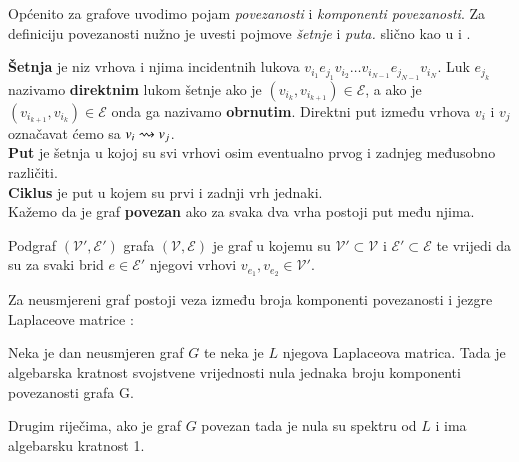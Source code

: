 Općenito za grafove uvodimo pojam \emph{povezanosti} i \emph{komponenti povezanosti}. Za definiciju povezanosti nužno je uvesti pojmove \emph{šetnje} i \emph{puta.} slično kao u \cite{Diskretna} i \cite{Operacijska}.
\begin{defn}
    \textbf{Šetnja} je niz vrhova i njima incidentnih lukova $v_{i_1} e_{j_1} v_{i_2} \dots v_{i_{N-1}} e_{j_{N-1}} v_{i_N}$. Luk $e_{j_k}$ nazivamo \textbf{direktnim} lukom šetnje ako je $(v_{i_k},v_{i_{k+1}}) \in \mathcal{E}$, a ako je $(v_{i_{k+1}},v_{i_k}) \in \mathcal{E}$ onda ga nazivamo \textbf{obrnutim}. Direktni put između vrhova $v_i$ i $v_j$ označavat ćemo sa $v_i \rightsquigarrow v_j$.\\
    \textbf{Put} je šetnja u kojoj su svi vrhovi osim eventualno prvog i zadnjeg međusobno različiti.\\ 
    \textbf{Ciklus} je put u kojem su prvi i zadnji vrh jednaki.\\
    Kažemo da je graf \textbf{povezan} ako za svaka dva vrha postoji put među njima.
\end{defn}
\begin{defn}
    Podgraf $(\mathcal{V}', \mathcal{E}')$ grafa $(\mathcal{V}, \mathcal{E})$ je graf u kojemu su $\mathcal{V}' \subset  \mathcal{V}$ i $\mathcal{E}' \subset \mathcal{E}$ te vrijedi da su za svaki brid $e \in \mathcal{E'}$ njegovi vrhovi $v_{e_1},v_{e_2} \in \mathcal{V}'$.
    
\end{defn}

Za neusmjereni graf postoji veza između broja komponenti povezanosti i jezgre Laplaceove matrice \cite{smola2003kernels}:
\begin{thm}
    Neka je dan neusmjeren graf $G$ te neka je $L$ njegova Laplaceova matrica. Tada je algebarska kratnost svojstvene vrijednosti nula jednaka broju komponenti povezanosti grafa G.
\end{thm}
Drugim riječima, ako je graf $G$ povezan tada je nula su spektru od $L$ i ima algebarsku kratnost 1.



